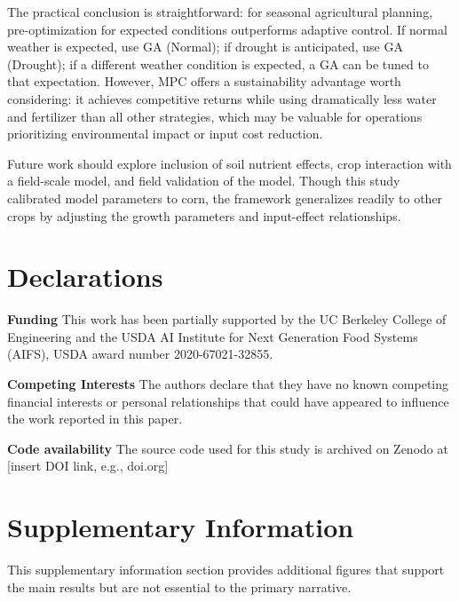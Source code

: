 \documentclass[pdflatex,sn-mathphys-num]{sn-jnl}
\begin{document}
The practical conclusion is straightforward: for seasonal agricultural planning, pre-optimization for expected conditions outperforms adaptive control. If normal weather is expected, use GA (Normal); if drought is anticipated, use GA (Drought); if a different weather condition is expected, a GA can be tuned to that expectation. However, MPC offers a sustainability advantage worth considering: it achieves competitive returns while using dramatically less water and fertilizer than all other strategies, which may be valuable for operations prioritizing environmental impact or input cost reduction.

Future work should explore inclusion of soil nutrient effects, crop interaction with a field-scale model, and field validation of the model. Though this study calibrated model parameters to corn, the framework generalizes readily to other crops by adjusting the growth parameters and input-effect relationships.

\section*{Declarations}

\textbf{Funding}
\noindent This work has been partially supported by the UC Berkeley College of Engineering and the USDA AI Institute for Next Generation Food Systems (AIFS), USDA award number 2020-67021-32855.

\noindent\textbf{Competing Interests}
\noindent The authors declare that they have no known competing financial interests or personal relationships that could have appeared to influence the work reported in this paper.

\noindent\textbf{Code availability}
\noindent The source code used for this study is archived on Zenodo at [insert DOI link, e.g., doi.org] 

\backmatter
\section{Supplementary Information}

This supplementary information section provides additional figures that support the main results but are not essential to the primary narrative.
\end{document}
